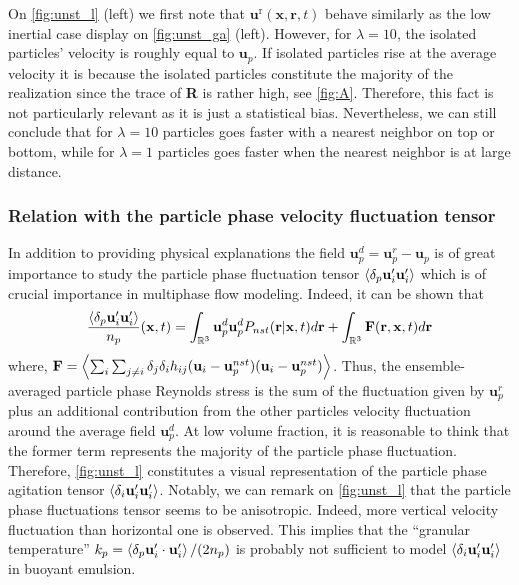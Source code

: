 On \ref{fig:unst_l} (left) we first note that $\textbf{u}^\text{r}(\textbf{x},\textbf{r},t)$ behave similarly as the low inertial case display on \ref{fig:unst_ga} (left).
However, for $\lambda = 10$, the isolated particles' velocity is roughly equal to $\textbf{u}_p$. 
If isolated particles rise at the average velocity it is because the isolated particles constitute the majority of the realization since the trace of \textbf{R} is rather high, see \ref{fig:A}.
Therefore, this fact is not particularly relevant as it is just a statistical bias. 
Nevertheless, we can still conclude that for $\lambda = 10$ particles goes faster with a nearest neighbor on top or bottom, while for  $\lambda = 1$ particles goes faster when the nearest neighbor is at large distance. 

\subsubsection{Relation with the particle phase velocity fluctuation tensor}

In addition to providing physical explanations the field $\textbf{u}_p^d = \textbf{u}^r_p - \textbf{u}_p$ is of great importance to study the particle phase fluctuation tensor $\left<\delta_p \textbf{u}_i' \textbf{u}_i'\right>$ which is of crucial importance in multiphase flow modeling. 
Indeed, it can be shown that 
\begin{equation}
    \frac{\pavg{ \textbf{u}_i' \textbf{u}_i'}}{n_p}(\textbf{x},t)
    =  
    \int_{\mathbb{R}^3 }
    \textbf{u}_p^d
    \textbf{u}_p^d
    P_{nst}(\textbf{r}|\textbf{x},t)
    d\textbf{r}
    + \int_{\mathbb{R}^3 }
    \textbf{F}(\textbf{r},\textbf{x},t)
    d\textbf{r}
    \label{eq:particle_center_of_mass_velocities}
\end{equation}
where, $\textbf{F} = \left<\sum_i\sum_{j\neq i}\delta_j\delta_i h_{ij}(\textbf{u}_i - \textbf{u}_p^{nst})(\textbf{u}_i - \textbf{u}_p^{nst})\right>$. 
Thus, the ensemble-averaged particle phase Reynolds stress is the sum of the fluctuation given by $\textbf{u}_p^r$ plus an additional contribution from the other particles velocity fluctuation around the average field $\textbf{u}_p^d$. 
At low volume fraction, it is reasonable to think that the former term represents the majority of the particle phase fluctuation. 
Therefore, \ref{fig:unst_l} constitutes a visual representation of the particle phase agitation tensor $\left<\delta_i \textbf{u}_i' \textbf{u}_i'\right>$. 
Notably, we can remark on \ref{fig:unst_l}  that the particle phase fluctuations tensor seems to be anisotropic. 
Indeed, more vertical velocity fluctuation than horizontal one is observed. 
This implies that the ``granular temperature'' $k_p = \left<\delta_p  \textbf{u}_i' \cdot \textbf{u}_i'\right>/(2n_p)$ is probably not sufficient to model $\left<\delta_i \textbf{u}_i' \textbf{u}_i'\right>$ in buoyant emulsion. 

